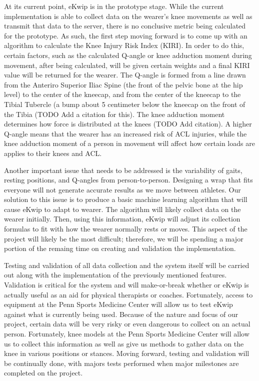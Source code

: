 At its current point, eKwip is in the prototype stage. While the current implementation is able to collect data on the wearer's knee movements as well as transmit that data to the server, there is no conclusive metric being calculated for the prototype. As such, the first step moving forward is to come up with an algorithm to calculate the Knee Injury Risk Index (KIRI). In order to do this, certain factors, such as the calculated Q-angle or knee adduction moment during movement, after being calculated, will be given certain weights and a final KIRI value will be returned for the wearer. The Q-angle is formed from a line drawn from the Anteriro Superior Iliac Spine (the front of the pelvic bone at the hip level) to the center of the kneecap, and from the center of the kneecap to the Tibial Tubercle (a bump about 5 centimeter below the kneecap on the front of the Tibia (TODO Add a citation for this). The knee adduction moment determines how force is distributed at the knees (TODO Add citation). A higher Q-angle means that the wearer has an increased risk of ACL injuries, while the knee adduction moment of a person in movement will affect how certain loads are applies to their knees and ACL. 

Another important issue that needs to be addressed is the variability of gaits, resting positions, and Q-angles from person-to-person. Designing a wrap that fits everyone will not generate accurate results as we move between athletes. Our solution to this issue is to produce a basic machine learning algorithm that will cause eKwip to adapt to wearer. The algorithm will likely collect data on the wearer initially. Then, using this information, eKwip will adjust its collection formulas to fit with how the wearer normally rests or moves. This aspect of the project will likely be the most difficult; therefore, we will be spending a major portion of the remaing time on creating and validation the implementation.

Testing and validation of all data collection and the system itself will be carried out along with the implementation of the previously mentioned features. Validation is critical for the system and will make-or-break whether or eKwip is actually useful as an aid for physical therapists or coaches. Fortunately, access to equipment at the Penn Sports Medicine Center will allow us to test eKwip against what is currently being used. Because of the nature and focus of our project, certain data will be very risky or even dangerous to collect on an actual person. Fortunately, knee models at the Penn Sports Medicine Center will allow us to collect this information as well as give us methods to gather data on the knee in various positions or stances. Moving forward, testing and validation will be continually done, with majors tests performed when major milestones are completed on the project.


